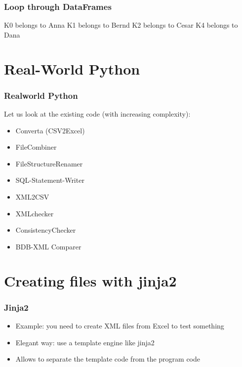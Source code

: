 \documentclass[ngerman]{beamer}
\begin{document}
\begin{frame}[containsverbatim]
\frametitle{Loop through DataFrames}



\begin{ausgabe}
K0 belongs to Anna
K1 belongs to Bernd
K2 belongs to Cesar
K4 belongs to Dana
\end{ausgabe}
\end{frame}



\section{Real-World Python}

\begin{frame}
\frametitle{Realworld Python}

Let us look at the existing code (with increasing complexity):\vspace*{1em}

\begin{itemize}
\item Converta (CSV2Excel)
\item FileCombiner
\item FileStructureRenamer
\item SQL-Statement-Writer
\item XML2CSV
\item XMLchecker
\item ConsistencyChecker
\item BDB-XML Comparer
\end{itemize}
\end{frame}

\section{Creating files with jinja2}

\begin{frame}
\frametitle{Jinja2}

\begin{itemize}
\item Example: you need to create XML files from Excel to test something
\item Elegant way: use a template engine like jinja2
\item Allows to separate the template code from the program code
\end{itemize}
\end{frame}
\end{document}
